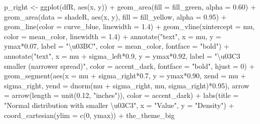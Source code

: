 \documentclass[
  letterpaper,
  DIV=11,
  numbers=noendperiod]{scrreprt}
\newenvironment{Shaded}{\begin{snugshade}}{\end{snugshade}}
\newcommand{\AttributeTok}[1]{\textcolor[rgb]{0.40,0.45,0.13}{#1}}
\newcommand{\DecValTok}[1]{\textcolor[rgb]{0.68,0.00,0.00}{#1}}
\newcommand{\FloatTok}[1]{\textcolor[rgb]{0.68,0.00,0.00}{#1}}
\newcommand{\FunctionTok}[1]{\textcolor[rgb]{0.28,0.35,0.67}{#1}}
\newcommand{\NormalTok}[1]{\textcolor[rgb]{0.00,0.23,0.31}{#1}}
\newcommand{\OtherTok}[1]{\textcolor[rgb]{0.00,0.23,0.31}{#1}}
\newcommand{\SpecialCharTok}[1]{\textcolor[rgb]{0.37,0.37,0.37}{#1}}
\newcommand{\StringTok}[1]{\textcolor[rgb]{0.13,0.47,0.30}{#1}}
\begin{document}
\begin{Shaded}
\begin{Highlighting}[]
\NormalTok{p\_right }\OtherTok{\textless{}{-}} \FunctionTok{ggplot}\NormalTok{(dfR, }\FunctionTok{aes}\NormalTok{(x, y)) }\SpecialCharTok{+}
  \FunctionTok{geom\_area}\NormalTok{(}\AttributeTok{fill =}\NormalTok{ fill\_green, }\AttributeTok{alpha =} \FloatTok{0.60}\NormalTok{) }\SpecialCharTok{+}
  \FunctionTok{geom\_area}\NormalTok{(}\AttributeTok{data =}\NormalTok{ shadeR, }\FunctionTok{aes}\NormalTok{(x, y), }\AttributeTok{fill =}\NormalTok{ fill\_yellow, }\AttributeTok{alpha =} \FloatTok{0.95}\NormalTok{) }\SpecialCharTok{+}
  \FunctionTok{geom\_line}\NormalTok{(}\AttributeTok{color =}\NormalTok{ curve\_blue, }\AttributeTok{linewidth =} \FloatTok{1.4}\NormalTok{) }\SpecialCharTok{+}
  \FunctionTok{geom\_vline}\NormalTok{(}\AttributeTok{xintercept =}\NormalTok{ mu, }\AttributeTok{color =}\NormalTok{ mean\_color, }\AttributeTok{linewidth =} \FloatTok{1.4}\NormalTok{) }\SpecialCharTok{+}
  \FunctionTok{annotate}\NormalTok{(}\StringTok{"text"}\NormalTok{, }\AttributeTok{x =}\NormalTok{ mu, }\AttributeTok{y =}\NormalTok{ ymax}\SpecialCharTok{*}\FloatTok{0.07}\NormalTok{, }\AttributeTok{label =} \StringTok{"\textbackslash{}u03BC"}\NormalTok{, }\AttributeTok{color =}\NormalTok{ mean\_color, }\AttributeTok{fontface =} \StringTok{"bold"}\NormalTok{) }\SpecialCharTok{+}
  \FunctionTok{annotate}\NormalTok{(}\StringTok{"text"}\NormalTok{, }\AttributeTok{x =}\NormalTok{ mu }\SpecialCharTok{+}\NormalTok{ sigma\_left}\SpecialCharTok{*}\FloatTok{0.9}\NormalTok{, }\AttributeTok{y =}\NormalTok{ ymax}\SpecialCharTok{*}\FloatTok{0.92}\NormalTok{, }\AttributeTok{label =} \StringTok{"\textbackslash{}u03C3 smaller (narrower spread)"}\NormalTok{, }\AttributeTok{color =}\NormalTok{ accent\_dark, }\AttributeTok{fontface =} \StringTok{"bold"}\NormalTok{, }\AttributeTok{hjust =} \DecValTok{0}\NormalTok{) }\SpecialCharTok{+}
  \FunctionTok{geom\_segment}\NormalTok{(}\FunctionTok{aes}\NormalTok{(}\AttributeTok{x =}\NormalTok{ mu }\SpecialCharTok{+}\NormalTok{ sigma\_right}\SpecialCharTok{*}\FloatTok{0.7}\NormalTok{, }\AttributeTok{y =}\NormalTok{ ymax}\SpecialCharTok{*}\FloatTok{0.90}\NormalTok{, }\AttributeTok{xend =}\NormalTok{ mu }\SpecialCharTok{+}\NormalTok{ sigma\_right, }\AttributeTok{yend =} \FunctionTok{dnorm}\NormalTok{(mu }\SpecialCharTok{+}\NormalTok{ sigma\_right, mu, sigma\_right)}\SpecialCharTok{*}\FloatTok{0.95}\NormalTok{),}
               \AttributeTok{arrow =} \FunctionTok{arrow}\NormalTok{(}\AttributeTok{length =} \FunctionTok{unit}\NormalTok{(}\FloatTok{0.12}\NormalTok{, }\StringTok{"inches"}\NormalTok{)), }\AttributeTok{color =}\NormalTok{ accent\_dark) }\SpecialCharTok{+}
  \FunctionTok{labs}\NormalTok{(}\AttributeTok{title =} \StringTok{"Normal distribution with smaller \textbackslash{}u03C3"}\NormalTok{, }\AttributeTok{x =} \StringTok{"Value"}\NormalTok{, }\AttributeTok{y =} \StringTok{"Density"}\NormalTok{) }\SpecialCharTok{+}
  \FunctionTok{coord\_cartesian}\NormalTok{(}\AttributeTok{ylim =} \FunctionTok{c}\NormalTok{(}\DecValTok{0}\NormalTok{, ymax)) }\SpecialCharTok{+}
\NormalTok{  the\_theme\_big}


\end{Highlighting}
\end{Shaded}
\end{document}
